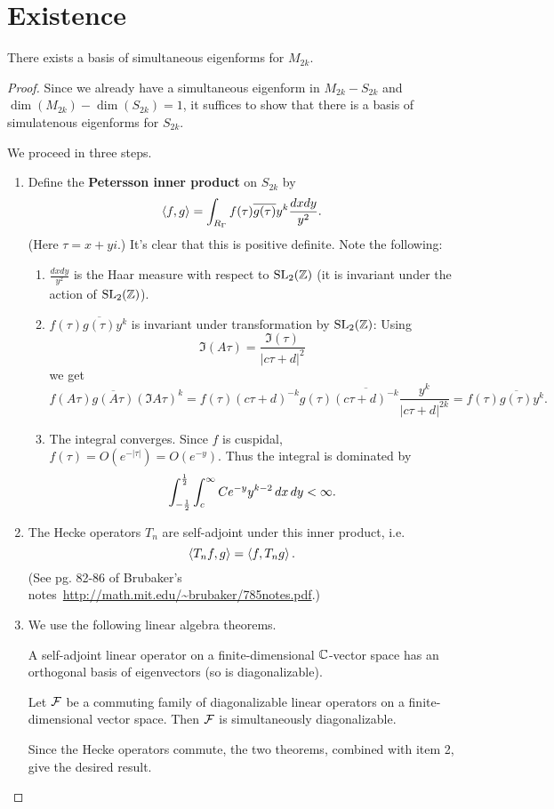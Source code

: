 \section{Existence}
\begin{thm}
There exists a basis of simultaneous eigenforms for $M_{2k}$.
\end{thm}
\begin{proof}
Since we already have a simultaneous eigenform in $M_{2k}-S_{2k}$ and $\dim(M_{2k})-\dim(S_{2k})=1$, it suffices to show that there is a basis of simulatenous eigenforms for $S_{2k}$.

We proceed in three steps.
\begin{enumerate}
\item
Define the \textbf{Petersson inner product} on $S_{2k}$ by
\[
\an{f,g}=\int_{R_{\Ga}} f(\tau)\overline{g(\tau)} y^k\frac{dxdy}{y^2}.
\]
(Here $\tau=x+yi$.) It's clear that this is positive definite.
Note the following:
\begin{enumerate}
\item
$\frac{dxdy}{y^2}$ is the Haar measure with respect to $\SL_2(\Z)$ (it is invariant under the action of $\SL_2(\Z)$).
\item
$f(\tau)\overline{g(\tau)} y^k$ is invariant under transformation by $\SL_2(\Z)$: Using
\[
\Im(A\tau)=\frac{\Im(\tau)}{|c\tau+d|^2}
\] 
we get 
\[f(A\tau)\overline{g(A\tau)}(\Im A\tau)^k=f(\tau)(c\tau+d)^{-k} g(\tau)\overline{(c\tau+d)^{-k}}\frac{y^k}{|c\tau+d|^{2k}}=
f(\tau)\overline{g(\tau)}y^k.\]
\item The integral converges. Since $f$ is cuspidal, $f(\tau)=O(e^{-|\tau|})=O(e^{-y})$. Thus the integral is dominated by
\[
\int_{-\rc 2}^{\rc2}\int_c^{\iy} Ce^{-y}{y^{k-2}}\,dx\,dy<\iy.
\]
\end{enumerate}
\item The Hecke operators $T_n$ are self-adjoint under this inner product, i.e.
\[
\an{T_nf,g}=\an{f,T_ng}.
\]
(See pg. 82-86 of Brubaker's notes~\url{http://math.mit.edu/~brubaker/785notes.pdf}.)
\item We use the following linear algebra theorems.
\begin{thm}
A self-adjoint linear operator on a finite-dimensional $\C$-vector space has an orthogonal basis of eigenvectors (so is diagonalizable).
\end{thm}
\begin{thm}
Let $\cal F$ be a commuting family of diagonalizable linear operators on a finite-dimensional vector space. Then $\cal F$ is simultaneously diagonalizable.
\end{thm}
Since the Hecke operators commute, the two theorems, combined with item 2, give the desired result.
\end{enumerate}
\end{proof}

